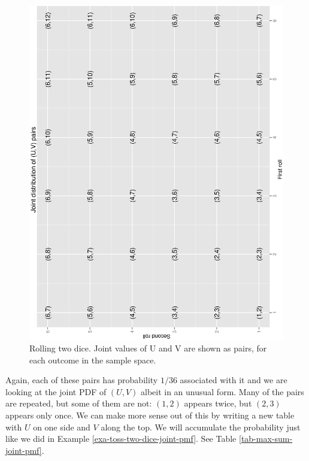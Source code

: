 \documentclass[captions=tableheading]{scrbook}
\begin{document}
\begin{example}
\begin{figure}[th]
  \includegraphics[angle=270, totalheight=4in]{ps/multdist/max-sum-two-dice-joint.ps}
  \caption[Joint outcomes of Max and Sum]{\small Rolling two dice. Joint values of U and V are shown as pairs, for each outcome in the sample space.}
  \label{fig-max-sum-two-dice-joint}
\end{figure}


Again, each of these pairs has probability \(1/36\) associated with it and we are looking at the joint PDF of \((U,V)\) albeit in an unusual form. Many of the pairs are repeated, but some of them are not: \((1,2)\) appears twice, but \((2,3)\) appears only once. We can make more sense out of this by writing a new table with \(U\) on one side and \(V\) along the top. We will accumulate the probability just like we did in Example \ref{exa-toss-two-dice-joint-pmf}. See Table \ref{tab-max-sum-joint-pmf}.


\end{example}
\end{document}
